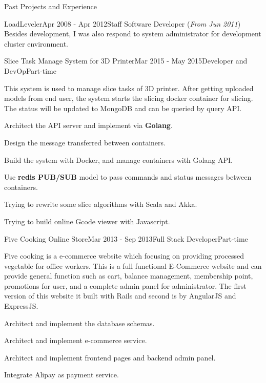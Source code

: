 \documentclass{resume} %
\begin{document}
\begin{rSection}{Past Projects and Experience}
\begin{rSubsection}{LoadLeveler}{Apr 2008 - Apr 2012}{Staff Software Developer (\textit{From Jun 2011})}{}
Besides development, I was also respond to system administrator for development cluster environment.
\end{rSubsection}
\vspace{1.8em}



\begin{rSubsection}{Slice Task Manage System for 3D Printer}{Mar 2015 - May 2015}{Developer and DevOp}{Part-time}

This system is used to manage slice tasks of 3D printer. After getting uploaded models from end user, the system starts the slicing docker container for slicing. The status will be updated to MongoDB and can be queried by query API.

\begin{rSubsectionList}
\item Architect the API server and implement via { \bf Golang}.
\item Design the message transferred between containers.
\item Build the system with Docker, and manage containers with Golang API.
\item Use { \bf redis PUB/SUB } model to pass commands and status messages between containers.
\item Trying to rewrite some slice algorithms with Scala and Akka.
\item Trying to build online Gcode viewer with Javascript.
\end{rSubsectionList}
\end{rSubsection}


\begin{rSubsection}{Five Cooking Online Store}{Mar 2013 - Sep 2013}{Full Stack Developer}{Part-time}

Five cooking is a e-commerce website which focusing on providing processed vegetable for office workers. This is a full functional E-Commerce website and can provide general function such as cart, balance management, membership point, promotions for user, and a complete admin panel for administrator. The first version of this website it built with Rails and second is by AngularJS and ExpressJS.

\begin{rSubsectionList}
\item Architect and implement the database schemas.
\item Architect and implement e-commerce service.
\item Architect and implement frontend pages and backend admin panel.
\item Integrate Alipay as payment service.
\end{rSubsectionList}
\end{rSubsection}



\end{rSection}
\end{document}
